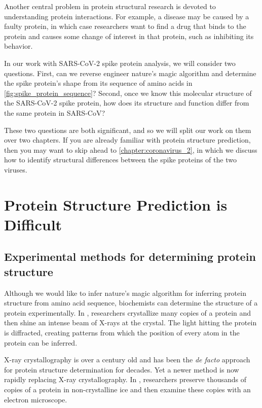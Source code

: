 Another central problem in protein structural research is devoted to understanding protein interactions. For example, a disease may be caused by a faulty protein, in which case researchers want to find a drug that binds to the protein and causes some change of interest in that protein, such as inhibiting its behavior.

In our work with SARS-CoV-2 spike protein analysis, we will consider two questions. First, can we reverse engineer nature's magic algorithm and determine the spike protein's shape from its sequence of amino acids in \autoref{fig:spike_protein_sequence}? Second, once we know this molecular structure of the SARS-CoV-2 spike protein, how does its structure and function differ from the same protein in SARS-CoV?

These two questions are both significant, and so we will split our work on them over two chapters. If you are already familiar with protein structure prediction, then you may want to skip ahead to \autoref{chapter:coronavirus_2}, in which we discuss how to identify structural differences between the spike proteins of the two viruses.\\

\FloatBarrier
{}

\section{Protein Structure Prediction is Difficult}
\label{sec:structure_intro}

\subsection{Experimental methods for determining protein structure}

Although we would like to infer nature's magic algorithm for inferring protein structure from amino acid sequence, biochemists can determine the structure of a protein experimentally. In , researchers crystallize many copies of a protein and then shine an intense beam of X-rays at the crystal. The light hitting the protein is diffracted, creating patterns from which the position of every atom in the protein can be inferred.

X-ray crystallography is over a century old and has been the \textit{de facto} approach for protein structure determination for decades. Yet a newer method is now rapidly replacing X-ray crystallography. In , researchers preserve thousands of copies of a protein in non-crystalline ice and then examine these copies with an electron microscope.

